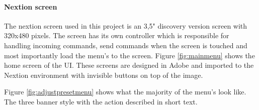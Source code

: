 \paragraph{Nextion screen}
The nextion screen used in this project is an 3,5" discovery version screen with 320x480 pixels. The screen has its own controller which is responsible for handling incoming commands, send commands when the screen is touched and most importantly load the menu's to the screen. Figure \ref{fig:mainmenu} shows the home screen of the UI. These screens are designed in Adobe and imported to the Nextion environment with invisible buttons on top of the image.

Figure \ref{fig:adjustpresetmenu} shows what the majority of the menu's look like. The three banner style with the action described in short text.